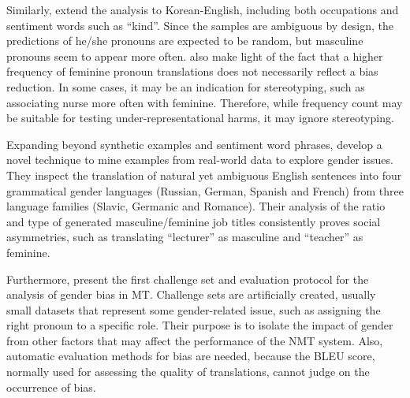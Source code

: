 Similarly, \citet{Cho_2019} extend the analysis to Korean-English, including both occupations and sentiment words such as “kind”. Since the samples are ambiguous by design, the predictions of he/she pronouns are expected to be random, but masculine pronouns seem to appear more often. \citet{Cho_2019} also make light of the fact that a higher frequency of feminine pronoun translations does not necessarily reflect a bias reduction. In some cases, it may be an indication for stereotyping, such as associating nurse more often with feminine. Therefore, while frequency count may be suitable for testing under-representational harms, it may ignore stereotyping.

Expanding beyond synthetic examples and sentiment word phrases, \citet{Gonen_2020} develop a novel technique to mine examples from real-world data to explore gender issues. They inspect the translation of natural yet ambiguous English sentences into four grammatical gender languages (Russian, German, Spanish and French) from three language families (Slavic, Germanic and Romance). Their analysis of the ratio and type of generated masculine/feminine job titles consistently proves social asymmetries, such as translating “lecturer” as masculine and “teacher” as feminine.

Furthermore, \citet{Stanovsky_2019} present the first challenge set and evaluation protocol for the analysis of gender bias in MT. Challenge sets are artificially created, usually small datasets that represent some gender-related issue, such as assigning the right pronoun to a specific role. Their purpose is to isolate the impact of gender from other factors that may affect the performance of the NMT system. Also, automatic evaluation methods for bias are needed, because the BLEU score, normally used for assessing the quality of translations, cannot judge on the occurrence of bias. 

